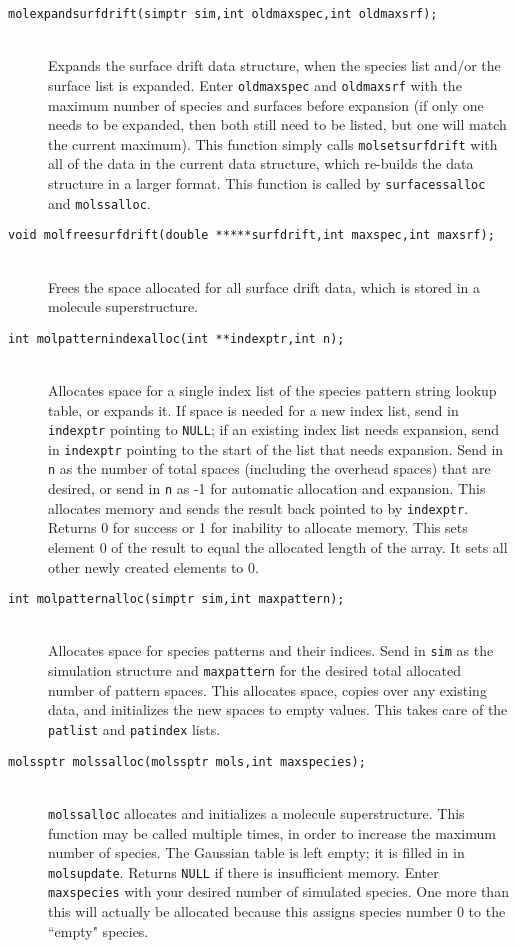 \documentclass {scrbook}
\newcommand {\ttt} {\texttt}
\begin{document}
\begin{description}
\item[\ttt{molexpandsurfdrift(simptr sim,int oldmaxspec,int oldmaxsrf);}]
\hfill \\
Expands the surface drift data structure, when the species list and/or the surface list is expanded. Enter \ttt{oldmaxspec} and \ttt{oldmaxsrf} with the maximum number of species and surfaces before expansion (if only one needs to be expanded, then both still need to be listed, but one will match the current maximum). This function simply calls \ttt{molsetsurfdrift} with all of the data in the current data structure, which re-builds the data structure in a larger format. This function is called by \ttt{surfacessalloc} and \ttt{molssalloc}.

\item[\ttt{void molfreesurfdrift(double *****surfdrift,int maxspec,int maxsrf);}]
\hfill \\
Frees the space allocated for all surface drift data, which is stored in a molecule superstructure.

\item[\ttt{int molpatternindexalloc(int **indexptr,int n);}]
\hfill \\
Allocates space for a single index list of the species pattern string lookup table, or expands it. If space is needed for a new index list, send in \ttt{indexptr} pointing to \ttt{NULL}; if an existing index list needs expansion, send in \ttt{indexptr} pointing to the start of the list that needs expansion. Send in \ttt{n} as the number of total spaces (including the overhead spaces) that are desired, or send in \ttt{n} as -1 for automatic allocation and expansion. This allocates memory and sends the result back pointed to by \ttt{indexptr}. Returns 0 for success or 1 for inability to allocate memory. This sets element 0 of the result to equal the allocated length of the array. It sets all other newly created elements to 0.

\item[\ttt{int molpatternalloc(simptr sim,int maxpattern);}]
\hfill \\
Allocates space for species patterns and their indices. Send in \ttt{sim} as the simulation structure and \ttt{maxpattern} for the desired total allocated number of pattern spaces. This allocates space, copies over any existing data, and initializes the new spaces to empty values. This takes care of the \ttt{patlist} and \ttt{patindex} lists.

\item[\ttt{molssptr molssalloc(molssptr mols,int maxspecies);}]
\hfill \\
\ttt{molssalloc} allocates and initializes a molecule superstructure. This function may be called multiple times, in order to increase the maximum number of species. The Gaussian table is left empty; it is filled in in \ttt{molsupdate}. Returns \ttt{NULL} if there is insufficient memory. Enter \ttt{maxspecies} with your desired number of simulated species. One more than this will actually be allocated because this assigns species number 0 to the ``empty" species.


\end{description}
\end{document}
